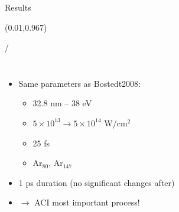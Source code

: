 \documentclass{beamer}
\makeatletter
\newcommand{\framenumber}{
\begin{textblock}{0}(0.01,0.967)
\begin{scriptsize}
{\color{gray}\insertframenumber/\inserttotalframenumber}
\end{scriptsize}
\end{textblock}
}
\makeatother
\begin{document}
\begin{frame}{Results}\framenumber


\begin{columns}
		\begin{itemize}
		\item Same parameters as Bostedt2008:
		\begin{itemize}
			\item 32.8 nm -- 38 eV
			\item $5\times10^{13} \rightarrow 5\times10^{14}$ W/cm$^2$
			\item 25 fs
			\item Ar$_{80}$, Ar$_{147}$
		\end{itemize}
		\item 1 ps duration (no significant changes after)
        \item<6-> {\color{red}$\rightarrow$ ACI most important process!}
		\end{itemize}

\begin{center}


\end{center}
\end{columns}
\end{frame}
\end{document}
